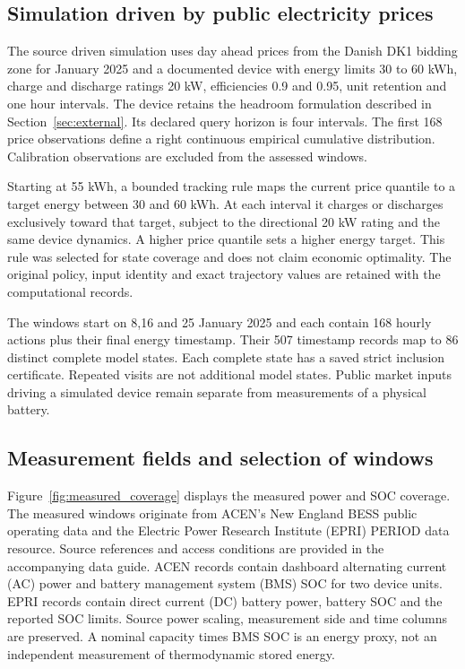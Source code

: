 \subsection{Simulation driven by public electricity prices}
The source driven simulation uses day ahead prices from the Danish DK1 bidding zone for
January 2025 and a documented device with energy limits 30 to 60 kWh,
charge and discharge ratings 20 kW, efficiencies 0.9 and 0.95, unit retention
and one hour intervals. The device retains the headroom formulation
described in Section~\ref{sec:external}. Its declared query horizon is four
intervals. The first 168 price observations define a right continuous
empirical cumulative distribution. Calibration observations are excluded
from the assessed windows.

Starting at 55 kWh, a bounded tracking rule maps the current price quantile
to a target energy between 30 and 60 kWh. At each interval it charges or
discharges exclusively toward that target, subject to the directional
20 kW rating and the same device dynamics. A higher price quantile sets a
higher energy target. This rule was selected for state coverage and does
not claim economic optimality. The original policy, input identity and
exact trajectory values are retained with the computational records.

The windows start on 8,16 and 25 January 2025 and each contain 168 hourly
actions plus their final energy timestamp. Their 507 timestamp records map
to 86 distinct complete model states. Each complete state has a saved strict
inclusion certificate. Repeated visits are not additional model states.
Public market inputs driving a simulated device remain separate from
measurements of a physical battery.

\subsection{Measurement fields and selection of windows}
Figure~\ref{fig:measured_coverage} displays the measured power and SOC coverage.
The measured windows originate from ACEN's New England BESS public
operating data and the Electric Power Research Institute (EPRI) PERIOD data resource. Source references and
access conditions are provided in the accompanying data guide. ACEN records
contain dashboard alternating current (AC) power and battery management system (BMS) SOC for two device
units. EPRI records contain direct current (DC) battery power, battery SOC and
the reported SOC limits. Source power scaling, measurement side and time
columns are preserved. A nominal capacity times BMS SOC is an energy
proxy, not an independent measurement of thermodynamic stored energy.

